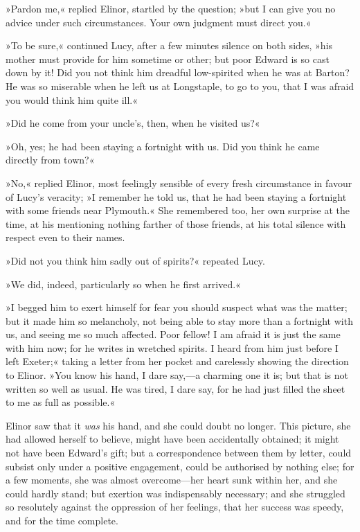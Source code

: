 »Pardon me,« replied Elinor, startled by the question; »but I can give you no advice under such circumstances. Your own judgment must direct you.«

»To be sure,« continued Lucy, after a few minutes silence on both sides, »his mother must provide for him sometime or other; but poor Edward is so cast down by it! Did you not think him dreadful low-spirited when he was at Barton? He was so miserable when he left us at Longstaple, to go to you, that I was afraid you would think him quite ill.«

»Did he come from your uncle’s, then, when he visited us?«

»Oh, yes; he had been staying a fortnight with us. Did you think he came directly from town?«

»No,« replied Elinor, most feelingly sensible of every fresh circumstance in favour of Lucy’s veracity; »I remember he told us, that he had been staying a fortnight with some friends near Plymouth.« She remembered too, her own surprise at the time, at his mentioning nothing farther of those friends, at his total silence with respect even to their names.

»Did not you think him sadly out of spirits?« repeated Lucy.

»We did, indeed, particularly so when he first arrived.«

»I begged him to exert himself for fear you should suspect what was the matter; but it made him so melancholy, not being able to stay more than a fortnight with us, and seeing me so much affected. Poor fellow! I am afraid it is just the same with him now; for he writes in wretched spirits. I heard from him just before I left Exeter;« taking a letter from her pocket and carelessly showing the direction to Elinor. »You know his hand, I dare say,—a charming one it is; but that is not written so well as usual. He was tired, I dare say, for he had just filled the sheet to me as full as possible.«

Elinor saw that it \textit{was} his hand, and she could doubt no longer. This picture, she had allowed herself to believe, might have been accidentally obtained; it might not have been Edward’s gift; but a correspondence between them by letter, could subsist only under a positive engagement, could be authorised by nothing else; for a few moments, she was almost overcome—her heart sunk within her, and she could hardly stand; but exertion was indispensably necessary; and she struggled so resolutely against the oppression of her feelings, that her success was speedy, and for the time complete.

